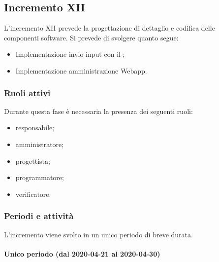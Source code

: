 
		\subsection{Incremento XII}
			
			L'incremento XII prevede la progettazione di dettaglio e codifica delle componenti software. Si prevede di svolgere quanto segue:
			\begin{itemize}
				\item Implementazione invio input con il ;
				\item Implementazione amministrazione Webapp.
			\end{itemize}
			
			\subsubsection{Ruoli attivi}
			
				Durante questa fase è necessaria la presenza dei seguenti ruoli:
				\begin{itemize}
					\item responsabile;
					\item amministratore;
					\item progettista;
					\item programmatore;
					\item verificatore.
				\end{itemize}
			
			\subsubsection{Periodi e attività}
			
				L'incremento viene svolto in un unico periodo di breve durata.
				
				\paragraph{Unico periodo (dal 2020-04-21 al 2020-04-30)}
				
